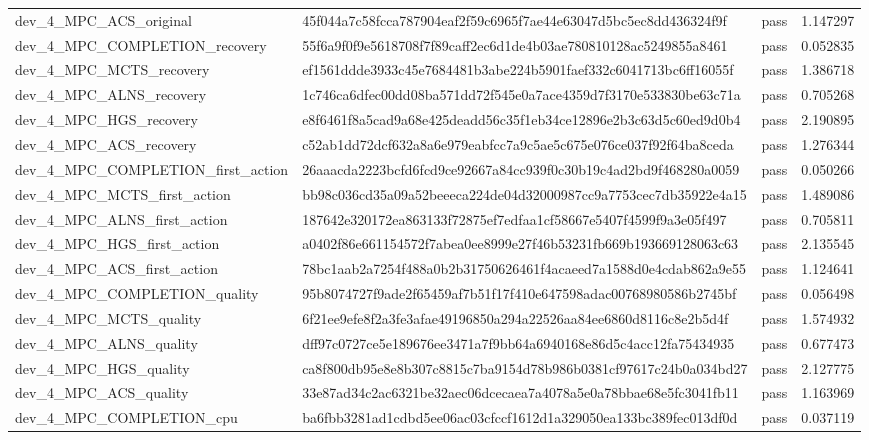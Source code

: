 \begin{tabular}{llll}
dev\_4\_MPC\_ACS\_original & 45f044a7c58fcca787904eaf2f59c6965f7ae44e63047d5bc5ec8dd436324f9f & pass & 1.147297 \\
dev\_4\_MPC\_COMPLETION\_recovery & 55f6a9f0f9e5618708f7f89caff2ec6d1de4b03ae780810128ac5249855a8461 & pass & 0.052835 \\
dev\_4\_MPC\_MCTS\_recovery & ef1561ddde3933c45e7684481b3abe224b5901faef332c6041713bc6ff16055f & pass & 1.386718 \\
dev\_4\_MPC\_ALNS\_recovery & 1c746ca6dfec00dd08ba571dd72f545e0a7ace4359d7f3170e533830be63c71a & pass & 0.705268 \\
dev\_4\_MPC\_HGS\_recovery & e8f6461f8a5cad9a68e425deadd56c35f1eb34ce12896e2b3c63d5c60ed9d0b4 & pass & 2.190895 \\
dev\_4\_MPC\_ACS\_recovery & c52ab1dd72dcf632a8a6e979eabfcc7a9c5ae5c675e076ce037f92f64ba8ceda & pass & 1.276344 \\
dev\_4\_MPC\_COMPLETION\_first\_action & 26aaacda2223bcfd6fcd9ce92667a84cc939f0c30b19c4ad2bd9f468280a0059 & pass & 0.050266 \\
dev\_4\_MPC\_MCTS\_first\_action & bb98c036cd35a09a52beeeca224de04d32000987cc9a7753cec7db35922e4a15 & pass & 1.489086 \\
dev\_4\_MPC\_ALNS\_first\_action & 187642e320172ea863133f72875ef7edfaa1cf58667e5407f4599f9a3e05f497 & pass & 0.705811 \\
dev\_4\_MPC\_HGS\_first\_action & a0402f86e661154572f7abea0ee8999e27f46b53231fb669b193669128063c63 & pass & 2.135545 \\
dev\_4\_MPC\_ACS\_first\_action & 78bc1aab2a7254f488a0b2b31750626461f4acaeed7a1588d0e4cdab862a9e55 & pass & 1.124641 \\
dev\_4\_MPC\_COMPLETION\_quality & 95b8074727f9ade2f65459af7b51f17f410e647598adac00768980586b2745bf & pass & 0.056498 \\
dev\_4\_MPC\_MCTS\_quality & 6f21ee9efe8f2a3fe3afae49196850a294a22526aa84ee6860d8116c8e2b5d4f & pass & 1.574932 \\
dev\_4\_MPC\_ALNS\_quality & dff97c0727ce5e189676ee3471a7f9bb64a6940168e86d5c4acc12fa75434935 & pass & 0.677473 \\
dev\_4\_MPC\_HGS\_quality & ca8f800db95e8e8b307c8815c7ba9154d78b986b0381cf97617c24b0a034bd27 & pass & 2.127775 \\
dev\_4\_MPC\_ACS\_quality & 33e87ad34c2ac6321be32aec06dcecaea7a4078a5e0a78bbae68e5fc3041fb11 & pass & 1.163969 \\
dev\_4\_MPC\_COMPLETION\_cpu & ba6fbb3281ad1cdbd5ee06ac03cfccf1612d1a329050ea133bc389fec013df0d & pass & 0.037119 \\

\end{tabular}
